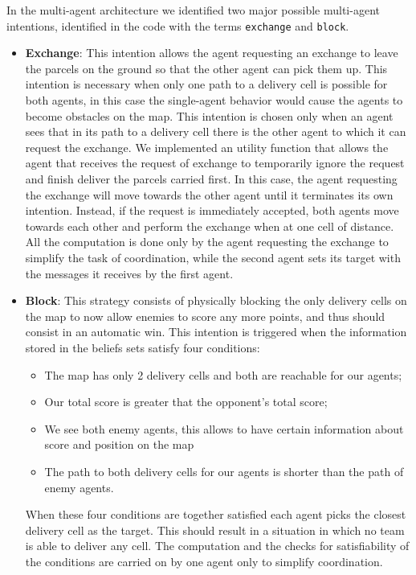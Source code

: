 \documentclass[a4paper, 11pt]{article}
\begin{document}
In the multi-agent architecture we identified two major possible multi-agent intentions, identified in the code with the terms \verb|exchange| and \verb|block|.
\begin{itemize}
\item \textbf{Exchange}: This intention allows the agent requesting an exchange to leave the parcels on the ground so that the other agent can pick them up. This intention is necessary when only one path to a delivery cell is possible for both agents, in this case the single-agent behavior would cause the agents to become obstacles on the map. This intention is chosen only when an agent sees that in its path to a delivery cell there is the other agent to which it can request the exchange. We implemented an utility function that allows the agent that receives the request of exchange to temporarily ignore the request and finish deliver the parcels carried first. In this case, the agent requesting the exchange will move towards the other agent until it terminates its own intention. Instead, if the request is immediately accepted, both agents move towards each other and perform the exchange when at one cell of distance. All the computation is done only by the agent requesting the exchange to simplify the task of coordination, while the second agent sets its target with the messages it receives by the first agent.
\item \textbf{Block}: This strategy consists of physically blocking the only delivery cells on the map to now allow enemies to score any more points, and thus should consist in an automatic win. This intention is triggered when the information stored in the beliefs sets satisfy four conditions:
\begin{itemize}
\item The map has only 2 delivery cells and both are reachable for our agents;
\item Our total score is greater that the opponent's total score;
\item We see both enemy agents, this allows to have certain information about score and position on the map
\item The path to both delivery cells for our agents is shorter than the path of enemy agents.
\end{itemize}
When these four conditions are together satisfied each agent picks the closest delivery cell as the target. This should result in a situation in which no team is able to deliver any cell. The computation and the checks for satisfiability of the conditions are carried on by one agent only to simplify coordination.
\end{itemize}
\end{document}

